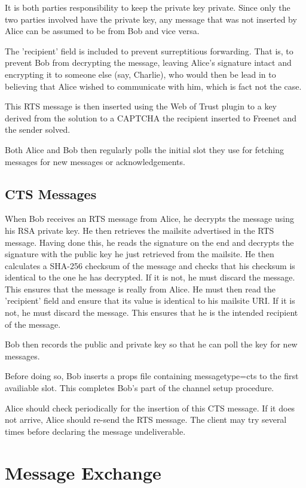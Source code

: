 \documentclass[12pt,a4paper]{article}
\begin{document}
It is both parties responsibility to keep the private key private. Since only the two parties
involved have the private key, any message that was not inserted by Alice can be assumed to be from
Bob and vice versa.

The 'recipient' field is included to prevent surreptitious forwarding. That is, to prevent Bob from
decrypting the message, leaving Alice's signature intact and encrypting it to someone else (say,
Charlie), who would then be lead in to believing that Alice wished to communicate with him, which is
fact not the case.

This RTS message is then inserted using the Web of Trust plugin to a key derived from the solution
to a CAPTCHA the recipient inserted to Freenet and the sender solved.

Both Alice and Bob then regularly polls the initial slot they use for fetching messages for new
messages or acknowledgements.

\subsection{CTS Messages}
When Bob receives an RTS message from Alice, he decrypts the message using his RSA private key. He
then retrieves the mailsite advertised in the RTS message. Having done this, he reads the signature
on the end and decrypts the signature with the public key he just retrieved from the mailsite. He
then calculates a SHA-256 checksum of the message and checks that his checksum is identical to the
one he has decrypted. If it is not, he must discard the message. This ensures that the message is
really from Alice. He must then read the 'recipient' field and ensure that its value is identical to his
mailsite URI. If it is not, he must discard the message. This ensures that he is the intended
recipient of the message.

Bob then records the public and private key so that he can poll the key for new messages.

Before doing so, Bob inserts a props file containing messagetype=cts to the first availiable slot.
This completes Bob's part of the channel setup procedure.

Alice should check periodically for the insertion of this CTS message. If it does not arrive, Alice
should re-send the RTS message. The client may try several times before declaring the message
undeliverable.

\section{Message Exchange}
\end{document}
